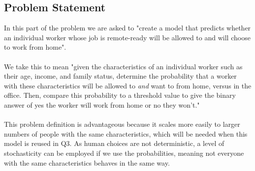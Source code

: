     
        \subsection{Problem Statement}
        In this part of the problem we are asked to "create a model that predicts whether an individual worker whose job is remote-ready will be allowed to and will choose to work from home".\\ \\ We take this to mean "given the characteristics of an individual worker such as their age, income, and family status, determine the probability that a worker with these characteristics will be allowed to \textit{and} want to from home, versus in the office. Then, compare this probability to a threshold value to give the binary answer of yes the worker will work from home or no they won't." \\ \\ This problem definition is advantageous because it scales more easily to larger numbers of people with the same characteristics, which will be needed when this model is reused in Q3. As human choices are not deterministic, a level of stochasticity can be employed if we use the probabilities, meaning not everyone with the same characteristics behaves in the same way.

